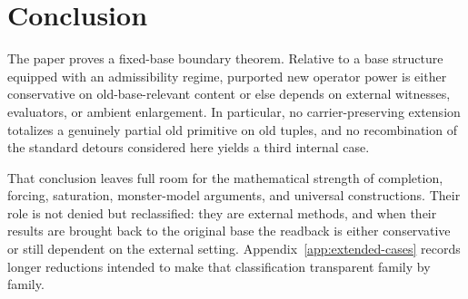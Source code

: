 \section{Conclusion}

The paper proves a fixed-base boundary theorem. Relative to a base structure equipped with an admissibility regime, purported new operator power is either conservative on old-base-relevant content or else depends on external witnesses, evaluators, or ambient enlargement. In particular, no carrier-preserving extension totalizes a genuinely partial old primitive on old tuples, and no recombination of the standard detours considered here yields a third internal case.

That conclusion leaves full room for the mathematical strength of completion, forcing, saturation, monster-model arguments, and universal constructions. Their role is not denied but reclassified: they are external methods, and when their results are brought back to the original base the readback is either conservative or still dependent on the external setting. Appendix~\ref{app:extended-cases} records longer reductions intended to make that classification transparent family by family.

